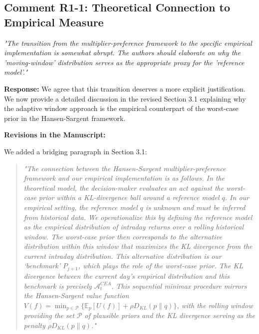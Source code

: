 \documentclass[12pt]{article}
\begin{document}
\subsection*{Comment R1-1: Theoretical Connection to Empirical Measure}
\textit{"The transition from the multiplier-preference framework to the specific empirical implementation is somewhat abrupt. The authors should elaborate on why the 'moving-window' distribution serves as the appropriate proxy for the 'reference model'."}

\begin{highlightbox}
\textbf{Response:} We agree that this transition deserves a more explicit justification. We now provide a detailed discussion in the revised Section 3.1 explaining why the adaptive window approach is the empirical counterpart of the worst-case prior in the Hansen-Sargent framework.
\end{highlightbox}

\begin{highlightbox}
\textbf{Revisions in the Manuscript:}

We added a bridging paragraph in Section 3.1:
\vspace{0.2cm}
\begin{quote}
\itshape "The connection between the Hansen-Sargent multiplier-preference framework and our empirical implementation is as follows. In the theoretical model, the decision-maker evaluates an act against the worst-case prior within a KL-divergence ball around a reference model $q$. In our empirical setting, the reference model $q$ is unknown and must be inferred from historical data. We operationalize this by defining the reference model as the empirical distribution of intraday returns over a rolling historical window. The worst-case prior then corresponds to the alternative distribution within this window that maximizes the KL divergence from the current intraday distribution. This alternative distribution is our `benchmark' $P_{j+1}$, which plays the role of the worst-case prior. The KL divergence between the current day's empirical distribution and this benchmark is precisely $\mathcal{A}^{CEA}_t$. This sequential minimax procedure mirrors the Hansen-Sargent value function $V(f) = \min_{p \in \mathcal{P}} \{\mathbb{E}_p[U(f)] + \rho D_{KL}(p\|q)\}$, with the rolling window providing the set $\mathcal{P}$ of plausible priors and the KL divergence serving as the penalty $\rho D_{KL}(p\|q)$."
\end{quote}
\end{highlightbox}
\end{document}
